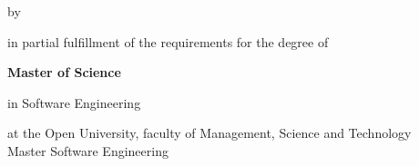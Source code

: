 \begin{titlepage}

\begin{center}


\vspace*{2\bigskipamount}

{\makeatletter
\titlestyle\color{red}\Huge\@title
\makeatother}

{\makeatletter
\ifx\@subtitle\undefined\else
    \bigskip
    \titlefont\titleshape\LARGE\@subtitle
\fi
\makeatother}

\bigskip
\bigskip

by

\bigskip
\bigskip

{\makeatletter
\titlefont\Large\bfseries\@author
\makeatother}

\vfill

in partial fulfillment of the requirements for the degree of

\bigskip
\bigskip

{\bfseries Master of Science}

in Software Engineering

\bigskip
\bigskip

at the Open University, faculty of Management, Science and Technology \\
Master Software Engineering


\end{center}
\end{titlepage}
